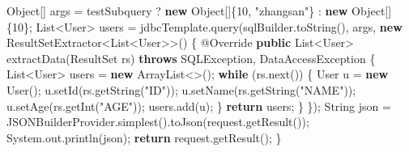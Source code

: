 \documentclass[
]{book}
\newenvironment{Shaded}{\begin{snugshade}}{\end{snugshade}}
\newcommand{\AttributeTok}[1]{\textcolor[rgb]{0.77,0.63,0.00}{#1}}
\newcommand{\BuiltInTok}[1]{#1}
\newcommand{\DecValTok}[1]{\textcolor[rgb]{0.00,0.00,0.81}{#1}}
\newcommand{\FunctionTok}[1]{\textcolor[rgb]{0.00,0.00,0.00}{#1}}
\newcommand{\KeywordTok}[1]{\textcolor[rgb]{0.13,0.29,0.53}{\textbf{#1}}}
\newcommand{\NormalTok}[1]{#1}
\newcommand{\StringTok}[1]{\textcolor[rgb]{0.31,0.60,0.02}{#1}}
\begin{document}
\begin{Shaded}
\begin{Highlighting}[]
{{        \BuiltInTok{Object}\NormalTok{[] args = testSubquery ? }\KeywordTok{new} \BuiltInTok{Object}\NormalTok{[]\{}\DecValTok{10}\NormalTok{, }\StringTok{"zhangsan"}\NormalTok{\} : }\KeywordTok{new} \BuiltInTok{Object}\NormalTok{[]\{}\DecValTok{10}\NormalTok{\};}
        \BuiltInTok{List}\NormalTok{<User> users = jdbcTemplate.}\FunctionTok{query}\NormalTok{(sqlBuilder.}\FunctionTok{toString}\NormalTok{(), args, }\KeywordTok{new}\NormalTok{ ResultSetExtractor<}\BuiltInTok{List}\NormalTok{<User>>() \{}
            \AttributeTok{@Override}
            \KeywordTok{public} \BuiltInTok{List}\NormalTok{<User> }\FunctionTok{extractData}\NormalTok{(}\BuiltInTok{ResultSet}\NormalTok{ rs) }\KeywordTok{throws} \BuiltInTok{SQLException}\NormalTok{, DataAccessException \{}
                \BuiltInTok{List}\NormalTok{<User> users = }\KeywordTok{new} \BuiltInTok{ArrayList}\NormalTok{<>();}
                \KeywordTok{while}\NormalTok{ (rs.}\FunctionTok{next}\NormalTok{()) \{}
\NormalTok{                    User u = }\KeywordTok{new} \FunctionTok{User}\NormalTok{();}
\NormalTok{                    u.}\FunctionTok{setId}\NormalTok{(rs.}\FunctionTok{getString}\NormalTok{(}\StringTok{"ID"}\NormalTok{));}
\NormalTok{                    u.}\FunctionTok{setName}\NormalTok{(rs.}\FunctionTok{getString}\NormalTok{(}\StringTok{"NAME"}\NormalTok{));}
\NormalTok{                    u.}\FunctionTok{setAge}\NormalTok{(rs.}\FunctionTok{getInt}\NormalTok{(}\StringTok{"AGE"}\NormalTok{));}
\NormalTok{                    users.}\FunctionTok{add}\NormalTok{(u);}
\NormalTok{                \}}
                \KeywordTok{return}\NormalTok{ users;}
\NormalTok{            \}}
\NormalTok{        \});}
        \BuiltInTok{String}\NormalTok{ json = JSONBuilderProvider.}\FunctionTok{simplest}\NormalTok{().}\FunctionTok{toJson}\NormalTok{(request.}\FunctionTok{getResult}\NormalTok{());}
        \BuiltInTok{System}\NormalTok{.}\FunctionTok{out}\NormalTok{.}\FunctionTok{println}\NormalTok{(json);}
        \KeywordTok{return}\NormalTok{ request.}\FunctionTok{getResult}\NormalTok{();}
\NormalTok{    \}}

}}
\end{Highlighting}
\end{Shaded}
\end{document}
